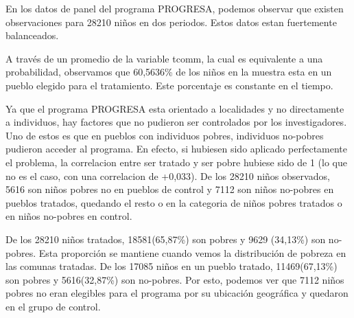 \documentclass[12pt]{article}
\newenvironment{problem}[2][Problem]{\begin{trivlist}
\item[\hskip \labelsep {\bfseries #1}\hskip \labelsep {\bfseries #2.}]}{\end{trivlist}}
\begin{document}




\begin{problem}{A.1}
En los datos de panel del programa PROGRESA, podemos observar que existen observaciones para 28210 niños en dos periodos. Estos datos estan fuertemente balanceados.
\end{problem}



\begin{problem}{A.2}
A través de un promedio de la variable tcomm, la cual es equivalente a una probabilidad, observamos que 60,5636\% de los niños en la muestra esta en un pueblo elegido para el tratamiento. Este porcentaje es constante en el tiempo.
\end{problem}




\begin{problem}{A.3}
Ya que el programa PROGRESA esta orientado a localidades y no directamente a individuos, hay factores que no pudieron ser controlados por los investigadores. Uno de estos es que en pueblos con individuos pobres, individuos no-pobres pudieron acceder al programa. En efecto, si hubiesen sido aplicado perfectamente el problema, la correlacion entre ser tratado y ser pobre hubiese sido de 1 (lo que no es el caso, con una correlacion de +0,033). De los 28210 niños observados, 5616 son niños pobres no en pueblos de control y 7112 son niños no-pobres en pueblos tratados, quedando el resto o en la categoria de niños pobres tratados o en niños no-pobres en control.
\end{problem}



\begin{problem}{A.4}
De los 28210 niños tratados, 18581(65,87\%) son pobres y 9629 (34,13\%) son no-pobres. Esta proporción se mantiene cuando vemos la distribución de pobreza en las comunas tratadas. De los 17085 niños en un pueblo tratado, 11469(67,13\%) son pobres y 5616(32,87\%) son no-pobres. Por esto, podemos ver que 7112 niños pobres no eran elegibles para el programa por su ubicación geográfica y quedaron en el grupo de control.
\end{problem}
\end{document}
